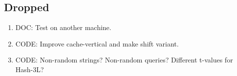 \documentclass[a4]{article}
\begin{document}
\ifarticle
{}
\fi %

\subsection*{Dropped}
\begin{enumerate}
\item DOC: Test on another machine.
\item CODE: Improve cache-vertical and make shift variant.
\item CODE: Non-random strings? Non-random queries? Different t-values for Hash-3L?
\end{enumerate}

\listoffixmes

\fi %
\end{document}
